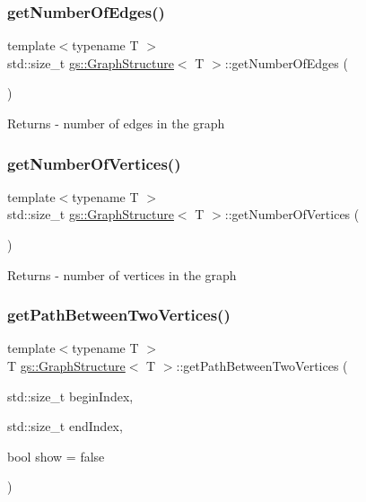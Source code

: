 \subsubsection{\texorpdfstring{get\+Number\+Of\+Edges()}{getNumberOfEdges()}}
{\footnotesize\ttfamily template$<$typename T $>$ \\
std\+::size\+\_\+t \mbox{\hyperlink{classgs_1_1_graph_structure}{gs\+::\+Graph\+Structure}}$<$ T $>$\+::get\+Number\+Of\+Edges (\begin{DoxyParamCaption}{ }\end{DoxyParamCaption})}

\begin{DoxyReturn}{Returns}
-\/ number of edges in the graph 
\end{DoxyReturn}
\mbox{\label{classgs_1_1_graph_structure_a973bb790243cd98bceac6188a79f47d6}} 
\subsubsection{\texorpdfstring{get\+Number\+Of\+Vertices()}{getNumberOfVertices()}}
{\footnotesize\ttfamily template$<$typename T $>$ \\
std\+::size\+\_\+t \mbox{\hyperlink{classgs_1_1_graph_structure}{gs\+::\+Graph\+Structure}}$<$ T $>$\+::get\+Number\+Of\+Vertices (\begin{DoxyParamCaption}{ }\end{DoxyParamCaption})}

\begin{DoxyReturn}{Returns}
-\/ number of vertices in the graph 
\end{DoxyReturn}
\mbox{\label{classgs_1_1_graph_structure_ac144d278d9b8a2d1bf0c4b59c0146348}} 
\subsubsection{\texorpdfstring{get\+Path\+Between\+Two\+Vertices()}{getPathBetweenTwoVertices()}}
{\footnotesize\ttfamily template$<$typename T $>$ \\
T \mbox{\hyperlink{classgs_1_1_graph_structure}{gs\+::\+Graph\+Structure}}$<$ T $>$\+::get\+Path\+Between\+Two\+Vertices (\begin{DoxyParamCaption}\item[{std\+::size\+\_\+t}]{begin\+Index,  }\item[{std\+::size\+\_\+t}]{end\+Index,  }\item[{bool}]{show = {\ttfamily false} }\end{DoxyParamCaption})}



